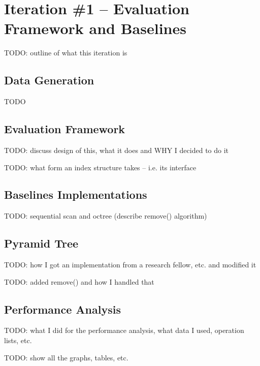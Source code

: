 \section{Iteration \#1 -- Evaluation Framework and Baselines}

TODO: outline of what this iteration is

\subsection{Data Generation}

TODO

\subsection{Evaluation Framework}

TODO: discuss design of this, what it does and WHY I decided to do it

TODO: what form an index structure takes -- i.e. its interface

\subsection{Baselines Implementations}

TODO: sequential scan and octree (describe remove() algorithm)

\subsection{Pyramid Tree}

TODO: how I got an implementation from a research fellow, etc. and modified it

TODO: added remove() and how I handled that

\subsection{Performance Analysis}

TODO: what I did for the performance analysis, what data I used, operation lists, etc.

TODO: show all the graphs, tables, etc.

